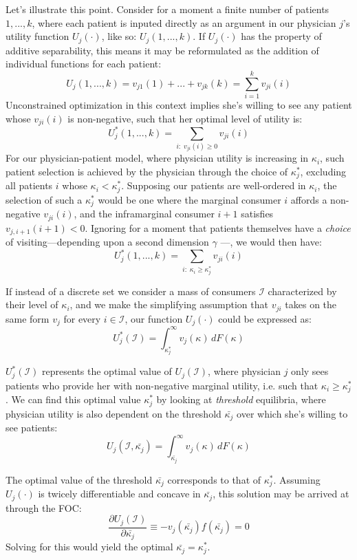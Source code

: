\documentclass[../main.tex]{subfiles}
\begin{document}
Let's illustrate this point. Consider for a moment a finite number of patients $1, ... , k$, where each patient is inputed directly as an argument in our physician $j$'s utility function $U_j(\cdot)$, like so: $U_j(1, ..., k)$. If $U_j(\cdot)$ has the property of additive separability, this means it may be reformulated as the addition of individual functions for each patient:
\[
U_j(1, ...,k) = v_{j1}(1) + ... + v_{jk}(k) = \sum_{i = 1}^{k} v_{ji}(i)
\]
Unconstrained optimization in this context implies she's willing to see any patient whose $v_{ji}(i)$ is non-negative, such that her optimal level of utility is:
\[
U_j^*(1, ...,k) =  \sum_{i : \; v_{ji}(i) \geq 0} v_{ji}(i)
\]
For our physician-patient model, where physician utility is increasing in $\kappa_i$, such patient selection is achieved by the physician through the choice of $\kappa_j^*$, excluding all patients $i$ whose $\kappa_i < \kappa_j^*$. Supposing our patients are well-ordered in $\kappa_i$, the selection of such a $\kappa_j^*$ would be one where the marginal consumer $i$ affords a non-negative $v_{ji}(i)$, and the inframarginal consumer $i + 1$ satisfies $v_{j,i+1}(i+1) < 0$. Ignoring for a moment that patients themselves have a \textit{choice} of visiting—depending upon a second dimension $\gamma$ —, we would then have:
\[
U_j^*(1, ...,k) =  \sum_{i : \; \kappa_i \geq \kappa_j^*} v_{ji}(i)
\]

If instead of a discrete set we consider a mass of consumers $\mathcal{I}$ characterized by their level of $\kappa_i$, and we make the simplifying assumption that $v_{ji}$ takes on the same form $v_{j}$ for every $i \in \mathcal{I}$, our function $U_j(\cdot)$ could be expressed as:
\[
U_j^*(\mathcal{I}) =\int_{\kappa_j^*}^{\infty} v_{j}(\kappa) \, dF(\kappa)
\]

$U_j^*(\mathcal{I})$ represents the optimal value of $U_j(\mathcal{I})$, where physician $j$ only sees patients who provide her with non-negative marginal utility, i.e. such that $\kappa_i \geq \kappa_j^*$. We can find this optimal value $\kappa_j^*$ by looking at \textit{threshold} equilibria, where physician utility is also dependent on the threshold $\bar{\kappa_j}$ over which she's willing to see patients:
\[
U_j(\mathcal{I}, \bar{\kappa_j}) =\int_{\bar{\kappa_j}}^{\infty} v_{j}(\kappa) \, dF(\kappa)
\]

The optimal value of the threshold $\bar{\kappa_j}$ corresponds to that of $\kappa_j^*$. Assuming $U_j(\cdot) $ is twicely differentiable and concave in $\bar{\kappa_j}$, this solution may be arrived at through the FOC:
\[
\frac{\partial U_j(\mathcal{I})}{\partial \bar{\kappa_j}} \equiv - v_{j}(\bar{\kappa_j})f(\bar{\kappa_j}) = 0
\]
Solving for this would yield the optimal $\bar{\kappa_j} = \kappa_j^*$.
\end{document}
